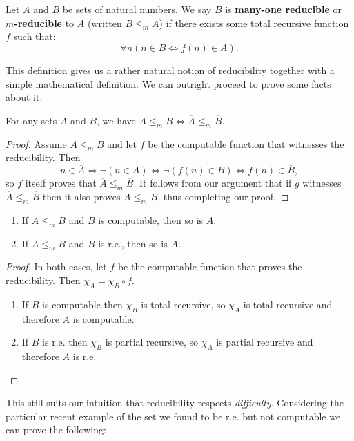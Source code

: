 \documentclass[../main.tex]{memoir}
\begin{document}
\begin{definition}
  \label{def:m-red}
  Let $A$ and $B$ be sets of natural numbers. We say $B$ is \textbf{many-one reducible} or \textbf{$m$-reducible} to $A$ (written $B \le_m A$) if there exists some total recursive function $f$ such that:
  \[ \forall n (n \in B \iff f(n) \in A). \]
\end{definition}

This definition gives us a rather natural notion of reducibility together with a simple mathematical definition. We can outright proceed to prove some facts about it.

\begin{lemma}
  For any sets $A$ and $B$, we have $A \le_m B \iff \overline{A} \le_m \overline{B}$.
\end{lemma}
\begin{proof}
  Assume $A \le_m B$ and let $f$ be the computable function that witnesses the reducibility. Then
  \[ n \in \overline{A} \iff \neg (n \in A) \iff \neg (f(n) \in B) \iff f(n) \in \overline{B}, \]
  so $f$ itself proves that $\overline{A} \le_m \overline{B}$. It follows from our argument that if $g$ witnesses $\overline{A} \le_m \overline{B}$ then it also proves $A \le_m B$, thus completing our proof.
\end{proof}

\begin{lemma}
  \label{lemma:mreducibility-monotone}
  \begin{enumerate}
  \item If $A \le_m B$ and $B$ is computable, then so is $A$.
  \item If $A \le_m B$ and $B$ is r.e., then so is $A$.
  \end{enumerate}
\end{lemma}
\begin{proof}
  In both cases, let $f$ be the computable function that proves the reducibility. Then $\chi_A = \chi_B \circ f$.
  \begin{enumerate}
  \item If $B$ is computable then $\chi_B$ is total recursive, so $\chi_A$ is total recursive and therefore $A$ is computable.
  \item If $B$ is r.e. then $\chi_B$ is partial recursive, so $\chi_A$ is partial recursive and therefore $A$ is r.e.
  \end{enumerate}
\end{proof}

This still suits our intuition that reducibility respects \textit{difficulty}. Considering the particular recent example of the set we found to be r.e. but not computable we can prove the following:
\end{document}
